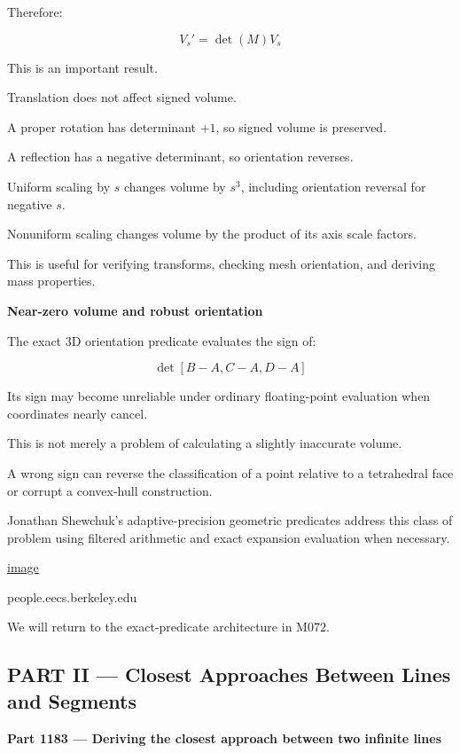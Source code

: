 Therefore:

\[
\boxed{ V_s'=\det(M)V_s }
\]

This is an important result.

Translation does not affect signed volume.

A proper rotation has determinant \(+1\), so signed volume is preserved.

A reflection has a negative determinant, so orientation reverses.

Uniform scaling by \(s\) changes volume by \(s^3\), including orientation reversal for negative \(s\).

Nonuniform scaling changes volume by the product of its axis scale factors.

This is useful for verifying transforms, checking mesh orientation, and deriving mass properties.

\textbf{Near-zero volume and robust orientation}

The exact 3D orientation predicate evaluates the sign of:

\[
\det[B-A,C-A,D-A]
\]

Its sign may become unreliable under ordinary floating-point evaluation when coordinates nearly cancel.

This is not merely a problem of calculating a slightly inaccurate volume.

A wrong sign can reverse the classification of a point relative to a tetrahedral face or corrupt a convex-hull construction.

Jonathan Shewchuk's adaptive-precision geometric predicates address this class of problem using filtered arithmetic and exact expansion evaluation when necessary. 

\href{https://www.google.com/s2/favicons?domain=https://people.eecs.berkeley.edu&sz=32}{image}

people.eecs.berkeley.edu

We will return to the exact-predicate architecture in M072.

\subsection{PART II --- Closest Approaches Between Lines and Segments}\label{04-visual-computing-ii-ch022-part-ii-closest-approaches-between-lines-and-segments}

\hypertarget{04-visual-computing-ii-ch022-part-ii-closest-approaches-between-lines-and-segments}{}

\textbf{Part 1183 --- Deriving the closest approach between two infinite lines}


